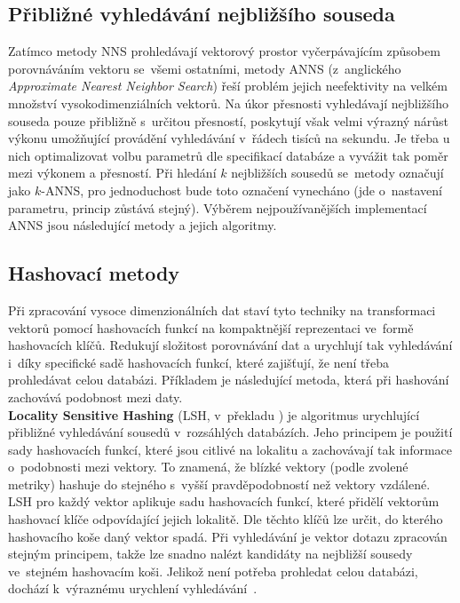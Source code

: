 \subsection{Přibližné vyhledávání nejbližšího souseda}
\label{anns}
Zatímco metody NNS prohledávají vektorový prostor vyčerpávajícím způsobem porovnáváním vektoru se~všemi ostatními, metody ANNS (z~anglického \textit{Approximate Nearest Neighbor Search}) řeší problém jejich neefektivity na velkém množství vysokodimenziálních vektorů. Na úkor přesnosti vyhledávají nejbližšího souseda pouze přibližně s~určitou přesností, poskytují však velmi výrazný nárůst výkonu umožňující provádění vyhledávání v~řádech tisíců na sekundu. Je třeba u nich optimalizovat volbu parametrů dle specifikací databáze a vyvážit tak poměr mezi výkonem a přesností. Při hledání $k$ nejbližších sousedů se~metody označují jako $k$-ANNS, pro jednoduchost bude toto označení vynecháno (jde o~nastavení parametru, princip zůstává stejný). Výběrem nejpoužívanějších implementací ANNS jsou následující metody a jejich algoritmy.

\subsection{Hashovací metody}
Při zpracování vysoce dimenzionálních dat staví tyto techniky na transformaci vektorů pomocí hashovacích funkcí na kompaktnější reprezentaci ve~formě hashovacích klíčů. Redukují složitost porovnávání dat a urychlují tak vyhledávání i~díky specifické sadě hashovacích funkcí, které zajišťují, že není třeba prohledávat celou databázi. Příkladem je následující metoda, která při hashování zachovává podobnost mezi daty. \\

\textbf{Locality Sensitive Hashing} (LSH, v~překladu ) je algoritmus urychlující přibližné vyhledávání sousedů v~rozsáhlých databázích. Jeho principem je použití sady hashovacích funkcí, které jsou citlivé na lokalitu a zachovávají tak informace o~podobnosti mezi vektory. To znamená, že blízké vektory (podle zvolené metriky) hashuje do stejného  s~vyšší pravděpodobností než vektory vzdálené. LSH pro každý vektor aplikuje sadu hashovacích funkcí, které přidělí vektorům hashovací klíče odpovídající jejich lokalitě. Dle těchto klíčů lze určit, do kterého hashovacího koše daný vektor spadá. Při vyhledávání je vektor dotazu zpracován stejným principem, takže lze snadno nalézt kandidáty na nejbližší sousedy ve~stejném hashovacím koši. Jelikož není potřeba prohledat celou databázi, dochází k~výraznému urychlení vyhledávání~\cite{lsh}.

